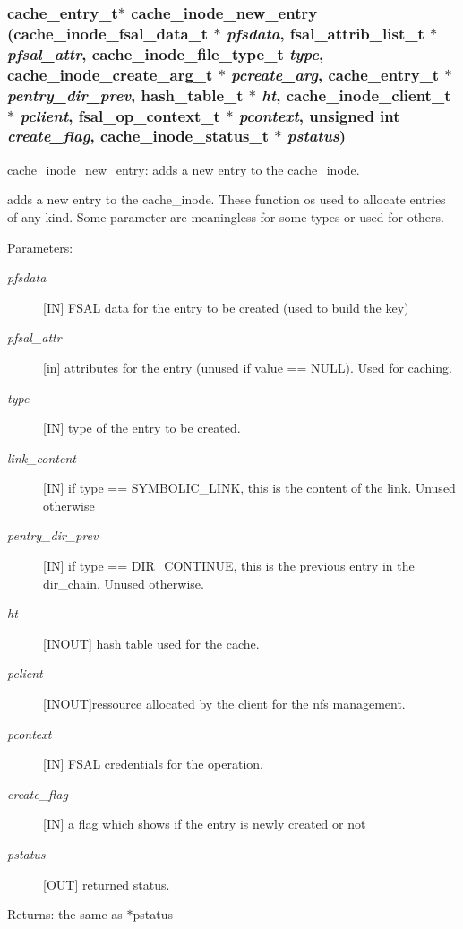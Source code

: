 \subsubsection{\setlength{\rightskip}{0pt plus 5cm}cache\_\-entry\_\-t$\ast$ cache\_\-inode\_\-new\_\-entry (cache\_\-inode\_\-fsal\_\-data\_\-t $\ast$ {\em pfsdata}, fsal\_\-attrib\_\-list\_\-t $\ast$ {\em pfsal\_\-attr}, cache\_\-inode\_\-file\_\-type\_\-t {\em type}, cache\_\-inode\_\-create\_\-arg\_\-t $\ast$ {\em pcreate\_\-arg}, cache\_\-entry\_\-t $\ast$ {\em pentry\_\-dir\_\-prev}, hash\_\-table\_\-t $\ast$ {\em ht}, cache\_\-inode\_\-client\_\-t $\ast$ {\em pclient}, fsal\_\-op\_\-context\_\-t $\ast$ {\em pcontext}, unsigned int {\em create\_\-flag}, cache\_\-inode\_\-status\_\-t $\ast$ {\em pstatus})}\label{cache__inode__misc_8c_a3}


cache\_\-inode\_\-new\_\-entry: adds a new entry to the cache\_\-inode.

adds a new entry to the cache\_\-inode. These function os used to allocate entries of any kind. Some parameter are meaningless for some types or used for others.

\begin{Desc}
\item[Parameters:]
\begin{description}
\item[{\em pfsdata}][IN] FSAL data for the entry to be created (used to build the key) \item[{\em pfsal\_\-attr}][in] attributes for the entry (unused if value == NULL). Used for caching. \item[{\em type}][IN] type of the entry to be created. \item[{\em link\_\-content}][IN] if type == SYMBOLIC\_\-LINK, this is the content of the link. Unused otherwise \item[{\em pentry\_\-dir\_\-prev}][IN] if type == DIR\_\-CONTINUE, this is the previous entry in the dir\_\-chain. Unused otherwise. \item[{\em ht}][INOUT] hash table used for the cache. \item[{\em pclient}][INOUT]ressource allocated by the client for the nfs management. \item[{\em pcontext}][IN] FSAL credentials for the operation. \item[{\em create\_\-flag}][IN] a flag which shows if the entry is newly created or not \item[{\em pstatus}][OUT] returned status.\end{description}
\end{Desc}
\begin{Desc}
\item[Returns:]the same as $\ast$pstatus \end{Desc}


